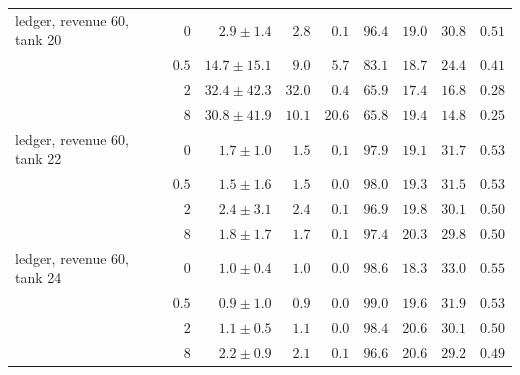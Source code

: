 \begin{tabular}{lrrrrrrrr}
\addlinespace
ledger, revenue 60, tank 20 & $0$ & $2.9\pm1.4$ & $2.8$ & $0.1$ & $96.4$ & $19.0$ & $30.8$ & $0.51$ \\
 & $0.5$ & $14.7\pm15.1$ & $9.0$ & $5.7$ & $83.1$ & $18.7$ & $24.4$ & $0.41$ \\
 & $2$ & $32.4\pm42.3$ & $32.0$ & $0.4$ & $65.9$ & $17.4$ & $16.8$ & $0.28$ \\
 & $8$ & $30.8\pm41.9$ & $10.1$ & $20.6$ & $65.8$ & $19.4$ & $14.8$ & $0.25$ \\
\addlinespace
ledger, revenue 60, tank 22 & $0$ & $1.7\pm1.0$ & $1.5$ & $0.1$ & $97.9$ & $19.1$ & $31.7$ & $0.53$ \\
 & $0.5$ & $1.5\pm1.6$ & $1.5$ & $0.0$ & $98.0$ & $19.3$ & $31.5$ & $0.53$ \\
 & $2$ & $2.4\pm3.1$ & $2.4$ & $0.1$ & $96.9$ & $19.8$ & $30.1$ & $0.50$ \\
 & $8$ & $1.8\pm1.7$ & $1.7$ & $0.1$ & $97.4$ & $20.3$ & $29.8$ & $0.50$ \\
\addlinespace
ledger, revenue 60, tank 24 & $0$ & $1.0\pm0.4$ & $1.0$ & $0.0$ & $98.6$ & $18.3$ & $33.0$ & $0.55$ \\
 & $0.5$ & $0.9\pm1.0$ & $0.9$ & $0.0$ & $99.0$ & $19.6$ & $31.9$ & $0.53$ \\
 & $2$ & $1.1\pm0.5$ & $1.1$ & $0.0$ & $98.4$ & $20.6$ & $30.1$ & $0.50$ \\
 & $8$ & $2.2\pm0.9$ & $2.1$ & $0.1$ & $96.6$ & $20.6$ & $29.2$ & $0.49$ \\
\bottomrule
\end{tabular}
